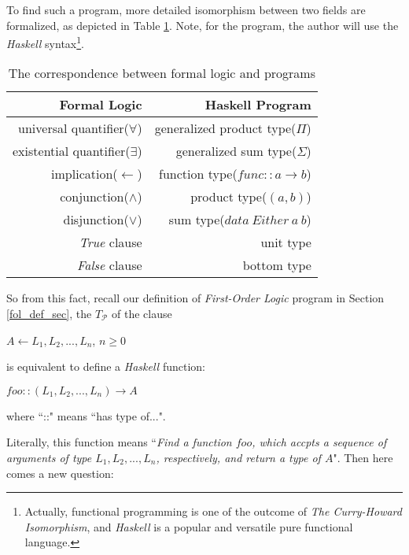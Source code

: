 \documentclass[letterpaper,10pt]{article}
\theoremstyle{definition}
\begin{document}
To find such a program, more detailed isomorphism between two fields are formalized, as depicted in Table \ref{tab:chi_tbl}. Note, for the program, the author will use the \emph{Haskell} syntax\footnote{Actually, functional programming is one of the outcome of \emph{The Curry-Howard Isomorphism}, and \emph{Haskell} is a popular and versatile pure functional language.}.

\begin{table}[H]
\centering
\begin{tabular}{|r|r|}
\hline
\textbf{Formal Logic}  & \textbf{Haskell Program} \\
\hline
universal quantifier($\forall$) & generalized product type($\Pi$) \\
\hline
existential quantifier($\exists$) & generalized sum type($\Sigma$) \\
\hline
implication($\leftarrow$) & function type($ func :: a \rightarrow b $) \\
\hline
conjunction($\wedge$) & product type($(a, b)$) \\
\hline
disjunction($\vee$) & sum type($data\ Either\ a\ b$) \\
\hline
\emph{True} clause & unit type \\
\hline
\emph{False} clause & bottom type \\
\hline
\end{tabular}
\caption{The correspondence between formal logic and programs}\label{tab:chi_tbl}
\end{table}

So from this fact, recall our definition of \emph{First-Order Logic} program in Section \ref{fol_def_sec}, the $T_{\mathcal{P}}$ of the clause  

\begin{center}	
$A \leftarrow L_1, L_2, ..., L_n$, $n \ge 0$\\
\end{center}

\noindent
is equivalent to define a \emph{Haskell}  function:

\begin{center}	
$ foo :: (L_1, L_2, ..., L_n) \rightarrow A $ 
\end{center}

\noindent
where  ``::" means ``has type of...".

Literally, this function means ``\emph{Find a function $foo$, which accpts a sequence of arguments of type $L_1, L_2, ..., L_n$, respectively, and return a type of $A$}". Then here comes a new question: 
\end{document}
